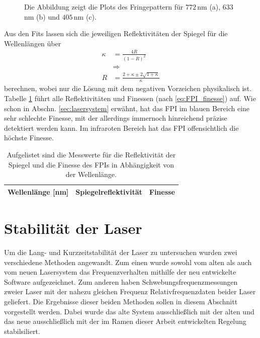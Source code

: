 \begin{figure}[hp]
	\caption[Finesse des FPIs]{Die Abbildung zeigt die Plots des
 	Fringepattern für $772\,$nm (a), $633\,$nm (b) und $405\,$nm (c).}
	\label{fig:finesse_messung}
 	\centering
 	\footnotesize
 	\fbox{\parbox{\dimexpr \linewidth - 2\fboxrule - 2\fboxsep}{
 	\subfloat[]{
		\label{subfig:finesse_messung_a}
		
		}\\
 	\subfloat[]{
		\label{subfig:finesse_messung_b}
		
		}\\
	 \subfloat[]{
		\label{subfig:finesse_messung_c}
		
		}
	}}
\end{figure}
Aus den Fits lassen sich die jeweiligen Reflektivitäten der Spiegel für die
Wellenlängen über
\begin{equation}\label{eq:finesse_messung_02}
	\begin{split}
		\kappa&=\frac{4R}{(1-R)^2}\\
		&\Rightarrow\\
		R&=\frac{2+\kappa\pm2\sqrt{1+\kappa}}{\kappa}
	\end{split}	
\end{equation}
berechnen, wobei nur die Lösung mit dem negativen Vorzeichen physikalisch ist.
Tabelle \ref{tab:finesse} führt alle Reflektivitäten und Finessen (nach
\eqref{eq:FPI_finesse}) auf. Wie schon in Abschn. \ref{sec:lasersystem} erwähnt, hat das FPI im blauen Bereich eine sehr schlechte Finesse, mit der
allerdings immernoch hinreichend präzise detektiert werden kann. Im infraroten
Bereich hat das FPI offensichtlich die höchste Finesse.
\begin{table}[h]
	\begin{tabular}{ccc}
		\toprule
		\multicolumn{1}{C{0.30\textwidth}}{Wellenlänge [nm]} &
		\multicolumn{1}{C{0.31\textwidth}}{Spiegelreflektivität} &
		\multicolumn{1}{C{0.30\textwidth}}{Finesse}\\
		\midrule[1px]
		\hline
		
		\bottomrule[1px]
	\end{tabular}
	\caption[FPI Finesse]{Aufgelistet sind die Messwerte für die Reflektivität der
	Spiegel und die Finesse des FPIs in Abhängigkeit von der Wellenlänge.}
	\label{tab:finesse}
\end{table}

\section{Stabilität der Laser}\label{sec:stabilitaet_der_laser}
Um die Lang- und Kurzzeitstabilität der Laser zu untersuchen wurden zwei
verschiedene Methoden angewandt. Zum einen wurde sowohl vom alten als auch vom
neuen Lasersystem das Frequenzverhalten mithilfe der neu entwickelte Software
aufgezeichnet. Zum anderen haben Schwebungsfrequenzmessungen zweier Laser mit
der nahezu gleichen Frequenz Relativfrequenzdaten beider Laser geliefert. Die
Ergebnisse dieser beiden Methoden sollen in diesem Abschnitt vorgestellt werden.
Dabei wurde das alte System ausschließlich mit der alten und das neue
ausschließlich mit der im Ramen dieser Arbeit entwickelten Regelung
stabilsiliert.

